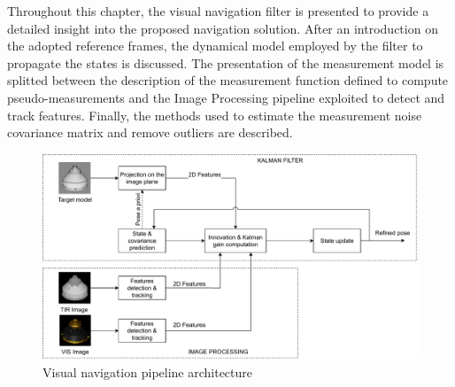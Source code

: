 Throughout this chapter, the visual navigation filter is presented to provide a detailed insight into the proposed navigation solution. After an introduction on the adopted reference frames, the dynamical model employed by the filter to propagate the states is discussed. The presentation of the measurement model is splitted between the description of the measurement function defined to compute pseudo-measurements and the Image Processing pipeline exploited to detect and track features. Finally, the methods used to estimate the measurement noise covariance matrix and remove outliers are described.


\begin{figure}[!h]
    \centering
    \includegraphics[width = \linewidth]{Images/archit.pdf}
    \caption{Visual navigation pipeline architecture}
    \label{fig:IPFilter}
\end{figure}

